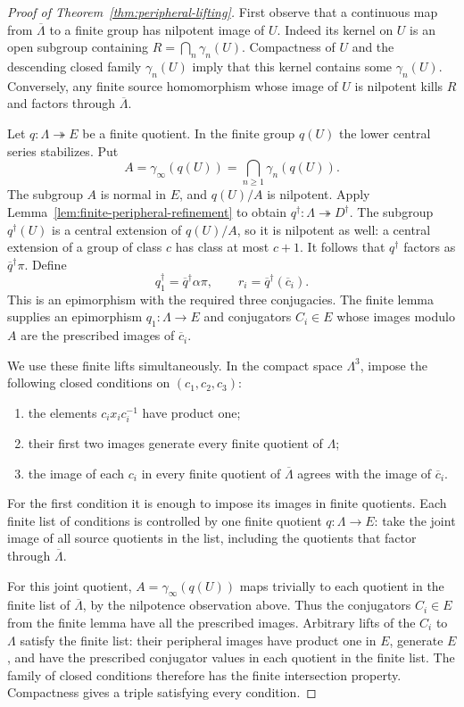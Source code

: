\begin{proof}[Proof of Theorem~\ref{thm:peripheral-lifting}]
First observe that a continuous map from $\overline\Lambda$ to a
finite group has nilpotent image of $U$. Indeed its kernel on $U$
is an open subgroup containing $R=\bigcap_n\gamma_n(U)$.
Compactness of $U$ and the descending closed family $\gamma_n(U)$
imply that this kernel contains some $\gamma_n(U)$. Conversely,
any finite source homomorphism whose image of $U$ is nilpotent kills
$R$ and factors through $\overline\Lambda$.

Let $q:\Lambda\twoheadrightarrow E$ be a finite quotient. In the
finite group $q(U)$ the lower central series stabilizes. Put
\[
 A=\gamma_\infty(q(U))
       =\bigcap_{n\geq1}\gamma_n(q(U)).
\]
The subgroup $A$ is normal in $E$, and $q(U)/A$ is nilpotent.
Apply Lemma~\ref{lem:finite-peripheral-refinement} to obtain
$q^\dagger:\Lambda\twoheadrightarrow D^\dagger$.
The subgroup $q^\dagger(U)$ is a central extension of $q(U)/A$,
so it is nilpotent as well: a central extension of a group of class
$c$ has class at most $c+1$. It follows that $q^\dagger$ factors
as $\overline q^\dagger\pi$. Define
\[
 q_1^\dagger=\overline q^\dagger\alpha\pi,
 \qquad r_i=\overline q^\dagger(\overline c_i).
\]
This is an epimorphism with the required three conjugacies. The
finite lemma supplies an epimorphism $q_1:\Lambda\to E$ and
conjugators $C_i\in E$ whose images modulo $A$ are the prescribed
images of $\overline c_i$.

We use these finite lifts simultaneously. In the compact space
$\Lambda^3$, impose the following closed conditions on $(c_1,c_2,c_3)$:
\begin{enumerate}
 \item the elements $c_ix_ic_i^{-1}$ have product one;
 \item their first two images generate every finite quotient of $\Lambda$;
 \item the image of each $c_i$ in every finite quotient of
       $\overline\Lambda$ agrees with the image of $\overline c_i$.
\end{enumerate}
For the first condition it is enough to impose its images in finite
quotients. Each finite list of conditions is controlled by one finite
quotient $q:\Lambda\to E$: take the joint image of all source
quotients in the list, including the quotients that factor through
$\overline\Lambda$.

For this joint quotient, $A=\gamma_\infty(q(U))$ maps trivially to
each quotient in the finite list of $\overline\Lambda$, by the nilpotence
observation above. Thus the conjugators $C_i\in E$ from the finite
lemma have all the prescribed images. Arbitrary lifts of the
$C_i$ to $\Lambda$ satisfy the finite list: their peripheral images
have product one in $E$, generate $E$, and have the prescribed
conjugator values in each quotient in the finite list. The family of closed
conditions therefore has the finite intersection property.
Compactness gives a triple satisfying every condition.


\end{proof}
